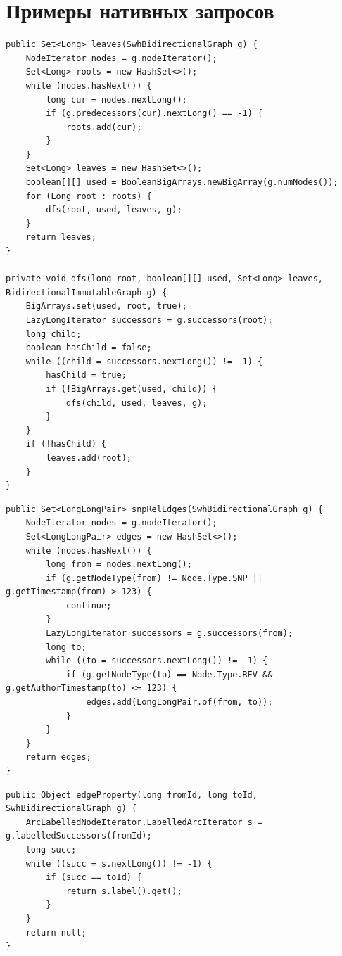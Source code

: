 \documentclass[times,specification,annotation]{itmo-student-thesis}
\begin{document}
\chapter{Примеры нативных запросов}\label{sec:app:native}
\begin{lstlisting}[float=!h,caption={Получение листьев графа нативным способом},label={lst:native-dfs}]
public Set<Long> leaves(SwhBidirectionalGraph g) {
    NodeIterator nodes = g.nodeIterator();
    Set<Long> roots = new HashSet<>();
    while (nodes.hasNext()) {
        long cur = nodes.nextLong();
        if (g.predecessors(cur).nextLong() == -1) {
            roots.add(cur);
        }
    }
    Set<Long> leaves = new HashSet<>();
    boolean[][] used = BooleanBigArrays.newBigArray(g.numNodes());
    for (Long root : roots) {
        dfs(root, used, leaves, g);
    }
    return leaves;
}

private void dfs(long root, boolean[][] used, Set<Long> leaves, BidirectionalImmutableGraph g) {
    BigArrays.set(used, root, true);
    LazyLongIterator successors = g.successors(root);
    long child;
    boolean hasChild = false;
    while ((child = successors.nextLong()) != -1) {
        hasChild = true;
        if (!BigArrays.get(used, child)) {
            dfs(child, used, leaves, g);
        }
    }
    if (!hasChild) {
        leaves.add(root);
    }
}
\end{lstlisting}

\begin{lstlisting}[float=!h,caption={Получение ребер по типам вершин нативным способом},label={lst:native-edges}]
public Set<LongLongPair> snpRelEdges(SwhBidirectionalGraph g) {
    NodeIterator nodes = g.nodeIterator();
    Set<LongLongPair> edges = new HashSet<>();
    while (nodes.hasNext()) {
        long from = nodes.nextLong();
        if (g.getNodeType(from) != Node.Type.SNP || g.getTimestamp(from) > 123) {
            continue;
        }
        LazyLongIterator successors = g.successors(from);
        long to;
        while ((to = successors.nextLong()) != -1) {
            if (g.getNodeType(to) == Node.Type.REV && g.getAuthorTimestamp(to) <= 123) {
                edges.add(LongLongPair.of(from, to));
            }
        }
    }
    return edges;
}
\end{lstlisting}

\begin{lstlisting}[float=!h,caption={Получение свойства ребра нативным способом},label={lst:native-edgeprop}]
public Object edgeProperty(long fromId, long toId, SwhBidirectionalGraph g) {
    ArcLabelledNodeIterator.LabelledArcIterator s = g.labelledSuccessors(fromId);
    long succ;
    while ((succ = s.nextLong()) != -1) {
        if (succ == toId) {
            return s.label().get();
        }
    }
    return null;
}
\end{lstlisting}
\end{document}
